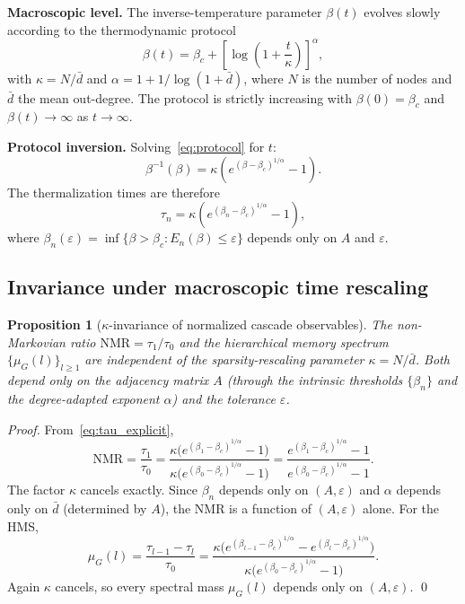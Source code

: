 \documentclass[aps,superscriptaddress,11pt]{revtex4-2}
\newcommand{\NMR}{\mathrm{NMR}}
\newtheorem{proposition}[theorem]{Proposition}
\theoremstyle{definition}
\theoremstyle{plain}
\begin{document}
\medskip\noindent\textbf{Macroscopic level.}
The inverse-temperature parameter $\beta(t)$ evolves slowly according to
the thermodynamic protocol
\begin{equation}
  \beta(t) = \beta_c + \left[\log\!\left(1+\frac{t}{\kappa}\right)\right]^\alpha,
  \label{eq:protocol}
\end{equation}
with $\kappa = N/\bar{d}$ and $\alpha = 1 + 1/\log(1+\bar{d})$, where $N$
is the number of nodes and $\bar{d}$ the mean out-degree. The protocol is
strictly increasing with $\beta(0) = \beta_c$ and $\beta(t) \to \infty$ as
$t \to \infty$.

\medskip\noindent\textbf{Protocol inversion.}
Solving~\eqref{eq:protocol} for $t$:
\begin{equation}
  \beta^{-1}(\beta)
  = \kappa\!\left(e^{(\beta-\beta_c)^{1/\alpha}} - 1\right).
  \label{eq:protocol_inv}
\end{equation}
The thermalization times are therefore
\begin{equation}
  \tau_n = \kappa\!\left(e^{(\beta_n - \beta_c)^{1/\alpha}} - 1\right),
  \label{eq:tau_explicit}
\end{equation}
where $\beta_n(\varepsilon) = \inf\{\beta > \beta_c : E_n(\beta) \leq
\varepsilon\}$ depends only on $A$ and $\varepsilon$.

\subsection*{Invariance under macroscopic time rescaling}

\begin{proposition}[$\kappa$-invariance of normalized cascade observables]
\label{prop:invariance}
The non-Markovian ratio $\NMR = \tau_1/\tau_0$ and the hierarchical memory
spectrum $\{\mu_G(l)\}_{l \geq 1}$ are independent of the
sparsity-rescaling parameter $\kappa = N/\bar{d}$. Both depend only on the
adjacency matrix $A$ (through the intrinsic thresholds $\{\beta_n\}$ and
the degree-adapted exponent $\alpha$) and the tolerance $\varepsilon$.
\end{proposition}

\begin{proof}
From~\eqref{eq:tau_explicit},
\[
  \NMR
  = \frac{\tau_1}{\tau_0}
  = \frac{\kappa\bigl(e^{(\beta_1-\beta_c)^{1/\alpha}}-1\bigr)}
         {\kappa\bigl(e^{(\beta_0-\beta_c)^{1/\alpha}}-1\bigr)}
  = \frac{e^{(\beta_1-\beta_c)^{1/\alpha}}-1}
         {e^{(\beta_0-\beta_c)^{1/\alpha}}-1}.
\]
The factor $\kappa$ cancels exactly. Since $\beta_n$ depends only on
$(A,\varepsilon)$ and $\alpha$ depends only on $\bar{d}$ (determined by
$A$), the NMR is a function of $(A,\varepsilon)$ alone. For the HMS,
\[
  \mu_G(l)
  = \frac{\tau_{l-1}-\tau_l}{\tau_0}
  = \frac{\kappa\bigl(e^{(\beta_{l-1}-\beta_c)^{1/\alpha}}-e^{(\beta_l-\beta_c)^{1/\alpha}}\bigr)}
         {\kappa\bigl(e^{(\beta_0-\beta_c)^{1/\alpha}}-1\bigr)}.
\]
Again $\kappa$ cancels, so every spectral mass $\mu_G(l)$ depends only on
$(A,\varepsilon)$. \qed
\end{proof}
\end{document}
